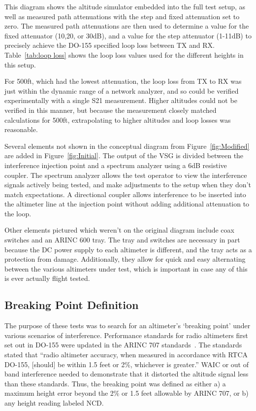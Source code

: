 This diagram shows the altitude simulator  embedded into the full test setup, as well as measured path attenuations with the step and fixed attenuation set to zero. The measured path attenuations are then used to determine a value for the fixed attenuator (10,20, or 30dB), and a value for the step attenuator (1-11dB) to precisely achieve the DO-155 specified loop loss between TX and RX. Table~\ref{tab:loop loss} shows the loop loss values used for the different heights in this setup. 

For 500ft, which had the lowest attenuation, the loop loss from TX to RX was just within the dynamic range of a network analyzer, and so could be verified experimentally with a single S21 measurement. Higher altitudes could not be verified in this manner, but because the measurement closely matched calculations for 500ft, extrapolating to higher altitudes and loop losses was reasonable. 

Several elements not shown in the conceptual diagram from Figure~\ref{fig:Modified} are added in Figure~\ref{fig:Initial}. The output of the VSG is divided between the interference injection point and a spectrum analyzer using a 6dB resistive coupler. The spectrum analyzer allows the test operator to view the interference signals actively being tested, and make adjustments to the setup when they don't match expectations. A directional coupler allows interference to be inserted into the altimeter line at the injection point without adding additional attenuation to the loop. 

 Other elements pictured which weren't on the original diagram include coax switches and an ARINC 600 tray. The tray and switches are necessary in part because the DC power supply to each altimeter is different, and the tray acts as a protection from damage. Additionally, they allow for quick and easy alternating between the various altimeters under test, which is important in case any of this is ever actually flight tested. 
\subsection{Breaking Point Definition}

The purpose of these tests was to search for an altimeter's `breaking point' under various scenarios of interference. Performance standards for radio altimeters first set out in DO-155 were updated in the ARINC 707 standards~\cite{noauthor_arinc_2009}. The standards stated that ``radio altimeter accuracy, when measured in accordance with RTCA DO-155, [should] be within 1.5 feet or 2\%, whichever is greater.''  WAIC or out of band interference needed to demonstrate that it distorted the altitude signal less than these standards. Thus, the breaking point was defined as either a) a maximum height error beyond the 2\% or 1.5 feet allowable by ARINC 707, or b) any height reading labeled NCD. 

